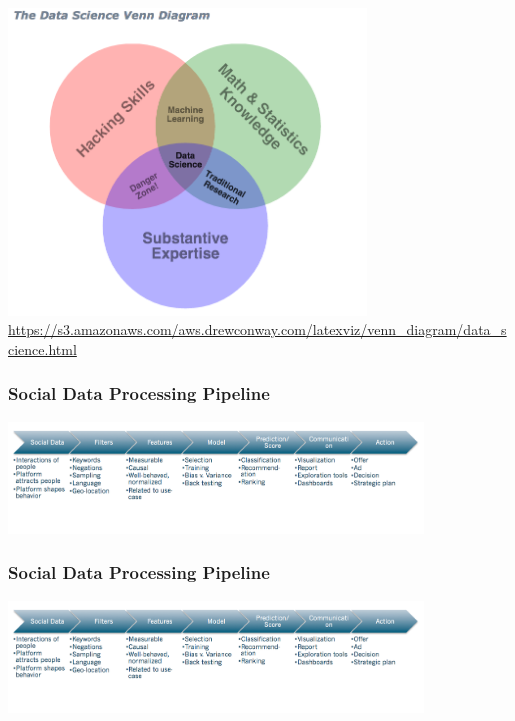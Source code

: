 \documentclass{beamer}
\begin{document}
\begin{frame}
  \begin{center}
    \includegraphics[width=9.5cm]{./imgs/conway_datascientist.png} \\
    \textcolor{white}{\tiny \url{https://s3.amazonaws.com/aws.drewconway.com/latexviz/venn_diagram/data_science.html}}
  \end{center}
\end{frame}

\begin{frame}\frametitle{Social Data Processing Pipeline}
  \begin{center}
    \includegraphics[width=11cm]{./imgs/pipeline.png} \\
  \end{center}
\end{frame}

\begin{frame}\frametitle{Social Data Processing Pipeline}
  \begin{center}
    \includegraphics[width=11cm]{./imgs/pipeline.png} \\
  \end{center}
\end{frame}
\end{document}
